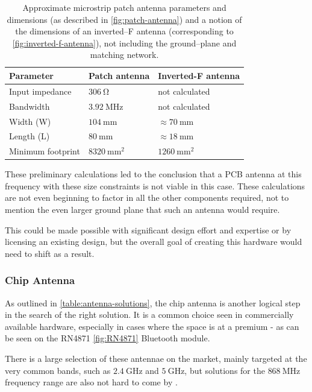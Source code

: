 \begin{table}[H]
\begin{center}
\caption{\label{table:antenna-pcb-calculations}Approximate microstrip patch antenna parameters and dimensions (as described in \ref{fig:patch-antenna}) and a notion of the dimensions of an inverted--F antenna (corresponding to \ref{fig:inverted-f-antenna}), not including the ground--plane and matching network.}
    \begin{tabular}{|l|l|l|} \hline
    \textbf{Parameter}  & \textbf{Patch antenna}    & \textbf{Inverted-F antenna} \\ \hline
    Input impedance     & $306~\mathrm{\Omega}$     & not calculated \\ \hline
    Bandwidth           & $3.92~\mathrm{MHz}$       & not calculated \\ \hline
    Width (W)           & $104~\mathrm{mm}$         & $\approx 70~\mathrm{mm}$ \\ \hline
    Length (L)          & $80~\mathrm{mm}$          & $\approx 18~\mathrm{mm}$ \\ \hline
    Minimum footprint   & $8320~\mathrm{mm^2}$      & $1260~\mathrm{mm^2}$ \\ \hline
    \end{tabular}
\end{center}
\end{table}

These preliminary calculations led to the conclusion that a PCB antenna at this frequency with these size constraints is not viable in this case. These calculations are not even beginning to factor in all the other components required, not to mention the even larger ground plane that such an antenna would require. 

This could be made possible with significant design effort and expertise or by licensing an existing design, but the overall goal of creating this hardware would need to shift as a result.

\subsubsection{Chip Antenna}
As outlined in \ref{table:antenna-solutions}, the chip antenna is another logical step in the search of the right solution. It is a common choice seen in commercially available hardware, especially in cases where the space is at a premium - as can be seen on the RN4871 \ref{fig:RN4871} Bluetooth module.

There is a large selection of these antennae on the market, mainly targeted at the very common bands, such as $2.4~\mathrm{GHz}$ and $5~\mathrm{GHz}$, but solutions for the $868~\mathrm{MHz}$ frequency range are also not hard to come by \cite{digikey_rf_2024,mouser_europe_868_2024}.

